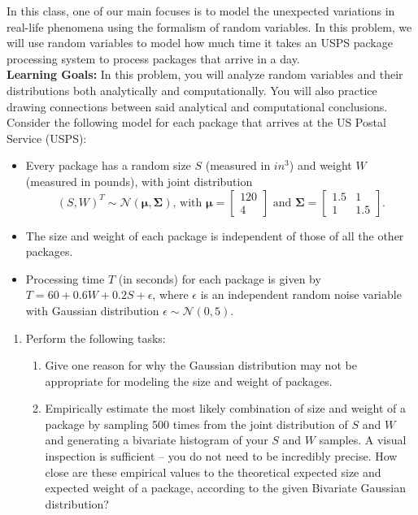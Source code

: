 \documentclass{../harvardml}
\theoremstyle{definition}
\theoremstyle{plain}
\begin{document}
\begin{problem}
In this class, one of our main focuses is to model the unexpected variations in real-life phenomena using the formalism of random variables. In this problem, we will use random variables to model how much time it takes an USPS package processing system to process packages that arrive in a day.\\

\noindent \textbf{Learning Goals:} In this problem, you will analyze random variables and their distributions both analytically and computationally. You will also practice drawing connections between said analytical and computational conclusions.\\

\noindent Consider the following model for each package that arrives at the US Postal Service (USPS):
\begin{itemize}
    \item Every package has a random size $S$ (measured in $in^3$) and weight $W$ (measured in pounds), with joint distribution
    $$(S, W)^{T} \sim \mathcal{N}\left( \boldsymbol{\mu}, \boldsymbol{\Sigma}\right) \text{, with } \boldsymbol{\mu} = \begin{bmatrix} 120 \\ 4 \end{bmatrix} \text{ and } \boldsymbol{\Sigma} = \begin{bmatrix} 1.5 & 1 \\ 1 & 1.5 \end{bmatrix}.$$ 
    \item The size and weight of each package is independent of those of all the other packages.
    \item Processing time $T$ (in seconds) for each package is given by $T = 60 + 0.6 W + 0.2 S + \epsilon$, where $\epsilon$ is an independent random noise variable with Gaussian distribution $\epsilon \sim \mathcal{N}(0, 5)$.
\end{itemize}

\begin{enumerate}
    \item Perform the following tasks:
    \begin{enumerate}
        \item Give one reason for why the Gaussian distribution may not be appropriate for modeling the size and weight of packages.
        
        \item Empirically estimate the most likely combination of size and weight of a package by sampling 500 times from the joint distribution of $S$ and $W$ and generating a bivariate histogram of your $S$ and $W$ samples. A visual inspection is sufficient -- you do not need to be incredibly precise.  How close are these empirical values to the theoretical expected size and expected weight of a package, according to the given Bivariate Gaussian distribution?


\end{enumerate}
\end{enumerate}
\end{problem}
\end{document}
